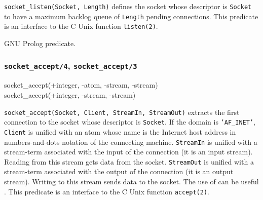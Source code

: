 \Description

\texttt{socket\_listen(Socket, Length)} defines the socket whose descriptor
is \texttt{Socket} to have a maximum backlog queue of \texttt{Length}
pending connections. This predicate is an interface to the C Unix function
\texttt{listen(2)}.

\begin{PlErrors}






\end{PlErrors}

\Portability

GNU Prolog predicate.

\subsubsection{\texttt{socket\_accept/4},
               \texttt{socket\_accept/3}}

\begin{TemplatesOneCol}
socket\_accept(+integer, -atom, -stream, -stream)\\
socket\_accept(+integer, -stream, -stream)

\end{TemplatesOneCol}

\Description

\texttt{socket\_accept(Socket, Client, StreamIn, StreamOut)} extracts the
first connection to the socket whose descriptor is \texttt{Socket}. If the
domain is \texttt{'AF\_INET'}, \texttt{Client} is unified with an atom whose
name is the Internet host address in numbers-and-dots notation of the
connecting machine. \texttt{StreamIn} is unified with a stream-term
associated with the input of the connection (it is an input stream). Reading
from this stream gets data from the socket. \texttt{StreamOut} is unified
with a stream-term associated with the output of the connection (it is an
output stream). Writing to this stream sends data to the socket. The use of
 can be useful . This predicate is an
interface to the C Unix function \texttt{accept(2)}.

